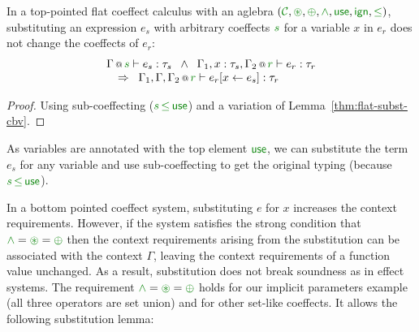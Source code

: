 \begin{lemma}
\label{thm:cbn-substitution-top}
In a top-pointed flat coeffect calculus with an aglebra $(\C, \cseq, \cpar, \czip, \cunit, \czero, \cleq)$,
substituting an expression $e_s$ with arbitrary coeffects $\cclrd{s}$ for a variable $x$ in $e_r$ does
not change the coeffects of $e_r$:
%
\begin{equation*}
\begin{array}{l}
 \coctx{\Gamma}{\cclrd{s}} \vdash e_s : \tau_s \;\; \wedge \;\; 
   \coctx{\Gamma_1,  x : \tau_s, \Gamma_2}{ \cclrd{r}  } \vdash e_r : \tau_r\\
 \quad \Rightarrow \;\; \coctx{\Gamma_1,\Gamma,\Gamma_2}{ \cclrd{r} } \vdash \subst{e_r}{x}{e_s} : \tau_r
\end{array}
\end{equation*}
\end{lemma}

\begin{proof}
Using sub-coeffecting ($\cclrd{s} \,\cleq\, \cunit$) and a variation of Lemma~\ref{thm:flat-subst-cbv}.
\end{proof}
%
\noindent
As variables are annotated with the top element $\cunit$, we can substitute the term $e_s$ 
for any variable and use sub-coeffecting to get the original typing (because
$\cclrd{s} \,\cleq\, \cunit$). 

In a bottom pointed coeffect system, substituting $e$ for $x$ increases the context 
requirements. However, if the system satisfies the strong condition that $\czip = \cseq = \cpar$ 
then the context requirements arising from the substitution can be associated with the context
$\Gamma$, leaving the context requirements of a function value unchanged. As a result, substitution 
does not break soundness as in effect systems. The requirement $\czip = \cseq = \cpar$ holds for 
our implicit parameters example (all three operators are set union) and for other set-like 
coeffects. It allows the following substitution lemma:


